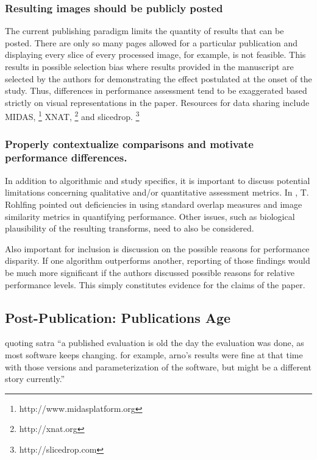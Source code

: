 \documentclass[final,5p,times,twocolumn]{elsarticle}
\begin{document}
\subsubsection{Resulting images should be publicly posted}

The current publishing paradigm limits the quantity of
results that can be posted.  There are only so many pages
allowed for a particular publication and displaying every
slice of every processed image, for example, is not feasible.  
This results in possible selection bias where results provided
in the manuscript are selected by the authors for demonstrating 
the effect postulated at the onset of the study.  Thus, differences
in performance assessment tend to be exaggerated based strictly
on visual representations in the paper.  Resources for data
sharing include MIDAS,%
\footnote{
http://www.midasplatform.org
}
XNAT,%
\footnote{
http://xnat.org
}
and slicedrop.%
\footnote{
http://slicedrop.com
}


\subsubsection{Properly contextualize comparisons and motivate performance differences.}
In addition to algorithmic and study specifics, it is important to 
discuss potential limitations concerning qualitative and/or quantitative 
assessment metrics.  In \cite{rohlfing2012}, T. Rohlfing pointed out 
deficiencies in using standard overlap measures and image similarity
metrics in quantifying performance.  Other issues, such as biological
plausibility of the resulting transforms, need to also be considered.

Also important for inclusion is discussion on the possible reasons for performance
disparity.  If one algorithm outperforms another, reporting of those findings 
would be much more significant if the authors discussed possible reasons
for relative  performance levels.  This simply constitutes evidence for
the claims of the paper.

\subsection{Post-Publication: Publications Age}

quoting satra ``a published evaluation is old the day the evaluation was done, as most software keeps changing. for example, arno's results were fine at that time with those versions and parameterization of the software, but might be a different story currently.''
\end{document}
